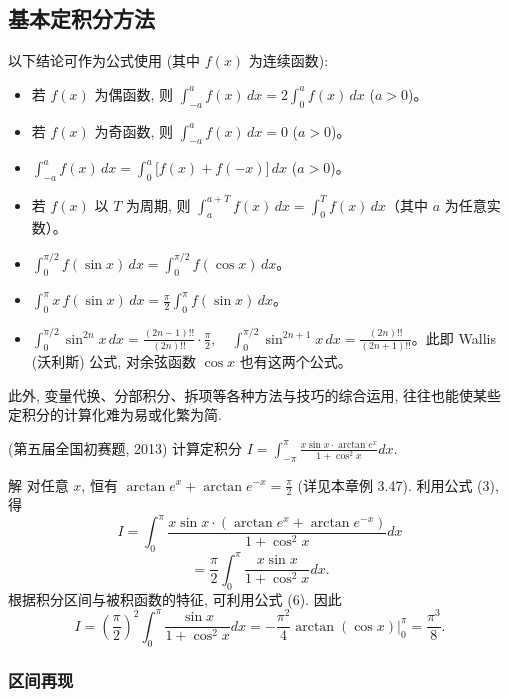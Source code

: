 \documentclass[lang=cn,newtx,10pt,scheme=chinese]{elegantbook}
\begin{document}
    \subsection{基本定积分方法}
    以下结论可作为公式使用 (其中 $f(x)$ 为连续函数):
    \begin{itemize}
      \item 若 $f(x)$ 为偶函数, 则 $\displaystyle \int_{-a}^a f(x)\,dx = 2 \int_0^a f(x)\,dx$ ($a > 0$)。
      \item 若 $f(x)$ 为奇函数, 则 $\displaystyle \int_{-a}^a f(x)\,dx = 0$ ($a > 0$)。
      \item $\displaystyle \int_{-a}^a f(x)\,dx = \int_0^a \big[f(x) + f(-x)\big] \, dx$ ($a > 0$)。
      \item 若 $f(x)$ 以 $T$ 为周期, 则 $\displaystyle \int_a^{a+T} f(x)\,dx = \int_0^T f(x)\,dx$（其中 $a$ 为任意实数）。
      \item $\displaystyle \int_0^{\pi/2} f(\sin x)\,dx = \int_0^{\pi/2} f(\cos x)\,dx$。
      \item $\displaystyle \int_0^\pi x\, f(\sin x)\,dx = \frac{\pi}{2} \int_0^\pi f(\sin x)\,dx$。
      \item $\displaystyle \int_0^{\pi/2} \sin^{2n} x\, dx = \frac{(2n - 1)!!}{(2n)!!} \cdot \frac{\pi}{2},\quad \int_0^{\pi/2} \sin^{2n+1} x\, dx = \frac{(2n)!!}{(2n + 1)!!}$。此即 Wallis (沃利斯) 公式, 对余弦函数 $\cos x$ 也有这两个公式。
    \end{itemize}

此外, 变量代换、分部积分、拆项等各种方法与技巧的综合运用, 往往也能使某些定积分的计算化难为易或化繁为简.

\begin{example}
  (第五届全国初赛题, 2013) 计算定积分 $I = \int_{-\pi}^\pi \frac{x \sin x \cdot \arctan e^x}{1 + \cos^2 x} dx$.
\end{example}
\begin{solution}
  解 对任意 $x$, 恒有 $\arctan e^x + \arctan e^{-x} = \frac{\pi}{2}$ (详见本章例 3.47). 利用公式 (3), 得
  $$
  I = \int_0^\pi \frac{x \sin x \cdot (\arctan e^x + \arctan e^{-x})}{1 + \cos^2 x} dx
  $$
  $$
  = \frac{\pi}{2} \int_0^\pi \frac{x \sin x}{1 + \cos^2 x} dx.
  $$
  根据积分区间与被积函数的特征, 可利用公式 (6). 因此
  $$
  I = \left(\frac{\pi}{2}\right)^2 \int_0^\pi \frac{\sin x}{1 + \cos^2 x} dx = -\frac{\pi^2}{4} \arctan(\cos x) \bigg|_0^\pi = \frac{\pi^3}{8}.
  $$
\end{solution}


    \subsubsection{区间再现}
\end{document}
